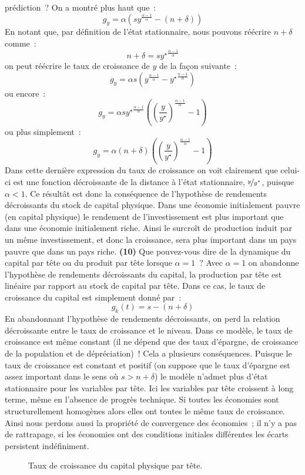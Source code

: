 \documentclass[10pt,a4paper,notitlepage]{article}
\newcommand{\question}[1]{\textbf{(#1)}}
\begin{document}
prédiction ?  {\color{red}  On a montré plus haut que :
\[
g_y = \alpha \left(sy^{\frac{\alpha-1}{\alpha}} - (n+\delta)\right)
\]
En notant que, par définition de l'état stationnaire, nous pouvons réécrire $n+\delta$ comme :
\[
n+\delta =s \left.y^{\star}\right.^{\frac{\alpha-1}{\alpha}}
\]
on peut réécrire le taux de croissance de $y$ de la façon suivante :
\[
g_y = \alpha s\left(y^{\frac{\alpha-1}{\alpha}} - \left.y^{\star}\right.^{\frac{\alpha-1}{\alpha}}\right)
\]
ou encore :
\[
g_y = \alpha s \left.y^{\star}\right.^{\frac{\alpha-1}{\alpha}} \left(\left(\frac{y}{y^{\star}}\right)^{\frac{\alpha-1}{\alpha}} - 1\right)
\]
ou plus simplement :
\[
g_y = \alpha (n+\delta) \left(\left(\frac{y}{y^{\star}}\right)^{\frac{\alpha-1}{\alpha}} - 1\right)
\]
Dans  cette  dernière  expression  du   taux  de  croissance  on  voit
clairement que celui-ci est une fonction décroissante de la distance à
l'état stationnaire, $\nicefrac{y}{y^{\star}}$, puisque $\alpha<1$. Ce
résultât  est  donc  la   conséquence  de  l'hypothèse  de  rendements
décroissants  du  stock  de   capital  physique.   Dans  une  économie
initialement   pauvre   (en   capital  physique)   le   rendement   de
l'investissement est plus important que dans une économie initialement
riche.   Ainsi   le  surcroît  de   production  induit  par   un  même
investissement, et  donc la  croissance, sera  plus important  dans un
pays pauvre que dans un  pays riche.  }  \question{10} Que pouvez-vous
dire  de la  dynamique du  capital  par tête  ou du  produit par  tête
lorsque  $\alpha=1$ ?   {\color{red}   Avec  $\alpha=1$  on  abandonne
  l'hypothèse de rendements décroissants du capital, la production par
  tête est linéaire par rapport au  stock de capital par tête. Dans ce
  cas, le taux de croissance du capital est simplement donné par :
\[
g_k(t) = s - (n+\delta) 
\]
En  abandonnant l'hypothèse  de  rendements décroissants,  on perd  la
relation décroissante entre  le taux de croissance et  le niveau. Dans
ce modèle, le  taux de croissance est même constant  (il ne dépend que
des   taux  d'épargne,   de  croissance   de  la   population  et   de
dépréciation) !  Cela  a plusieurs  conséquences.  Puisque le  taux de
croissance est constant  et positif (on suppose que  le taux d'épargne
est assez  important dans le  sens où $s>n+\delta$) le  modèle n'admet
plus  d'état  stationnaire  pour  les variables  par  tête.   Ici  les
variables  par tête  croissent  à  long terme,  même  en l'absence  de
progrès  technique.  Si  toutes  les  économies sont  structurellement
homogènes alors  elles ont  toutes le même  taux de  croissance. Ainsi
nous perdons aussi la propriété  de convergence des économies ; il n'y
a pas  de rattrapage,  si les économies  ont des  conditions initiales
différentes les écarts persistent indéfiniment.}\newline

\bigskip
\bigskip

\begin{figure}[H]
  \centering
  
  \caption{Taux de croissance du capital physique par tête.}
  \label{fig:question-5}
\end{figure}
\end{document}
